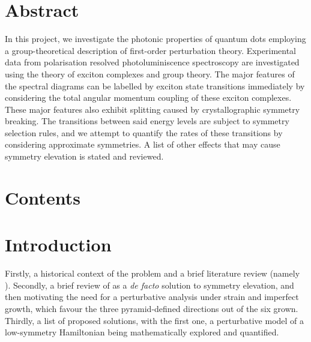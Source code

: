 \documentclass[12pt]{article}
\begin{document}







\section{Abstract}

In this project, we investigate the photonic properties of quantum dots employing a group-theoretical description of first-order perturbation theory. Experimental data from polarisation resolved photoluminiscence spectroscopy are investigated using the theory of exciton complexes and group theory. The major features of the spectral diagrams can be labelled by exciton state transitions immediately by considering the total angular momentum coupling of these exciton complexes. These major features also exhibit splitting caused by crystallographic symmetry breaking. The transitions between said energy levels are subject to symmetry selection rules, and we attempt to quantify the rates of these transitions by considering approximate symmetries. A list of other effects that may cause symmetry elevation is stated and reviewed.

\pagebreak

\section{Contents}


\renewcommand\contentsname{}

\begingroup
\let\clearpage\relax
\vspace{-1cm} %
\tableofcontents
\endgroup

\pagebreak

\section{Introduction}

Firstly, a historical context of the problem and a brief literature review (namely \cite{karlsson}). Secondly, a brief review of \cite{hexagon} as a \textit{de facto} solution to symmetry elevation, and then motivating the need for a perturbative analysis under strain and imperfect growth, which favour the three pyramid-defined directions out of the six grown. Thirdly, a list of proposed solutions, with the first one, a perturbative model of a low-symmetry Hamiltonian being mathematically explored and quantified.
\end{document}

